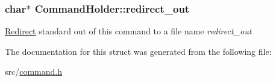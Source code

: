 \subsubsection[{\texorpdfstring{redirect\+\_\+out}{redirect_out}}]{\setlength{\rightskip}{0pt plus 5cm}char$\ast$ Command\+Holder\+::redirect\+\_\+out}\hypertarget{structCommandHolder_ac7bfc3e78a8e8b511e2b324c45a17d6f}{}\label{structCommandHolder_ac7bfc3e78a8e8b511e2b324c45a17d6f}
\hyperlink{structRedirect}{Redirect} standard out of this command to a file name {\itshape redirect\+\_\+out} 

The documentation for this struct was generated from the following file\+:\begin{DoxyCompactItemize}
\item 
src/\hyperlink{command_8h}{command.\+h}\end{DoxyCompactItemize}
